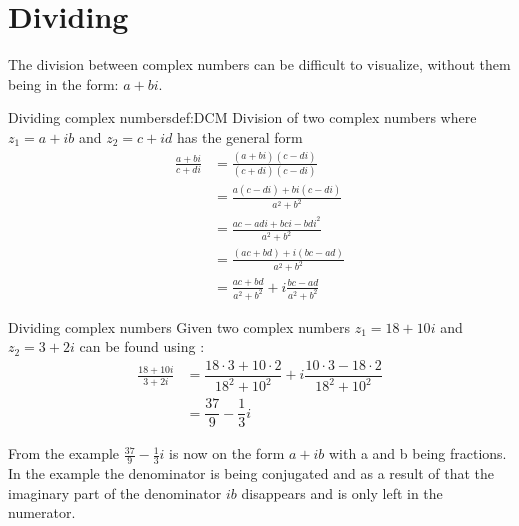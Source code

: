 \section{Dividing}
The division between complex numbers can be difficult to visualize, without them being in the form: $a + bi$. 
\begin{definition}{Dividing complex numbers}{def:DCM}
Division of two complex numbers where $z_1=a+ib$ and $z_2=c+id$ has the general form
\begin{align*}
\frac{a + bi}{c + di} 										
&= \frac{(a+bi)(c-di)}{(c+di)(c-di)} 						\\[1em]
&= \frac{a(c-di)+bi(c-di)}{a^2+b^2} 							\\[1em]
&= \frac{ac-adi+bci-bdi^2}{a^2+b^2}							\\[1em]
&= \frac{(ac+bd)+i(bc-ad)}{a^2+b^2}							\\[1em]
&= \frac{ac+bd}{a^2+b^2}+i \frac{bc-ad}{a^2+b^2}				
\end{align*}
\end{definition}
\begin{example}{Dividing complex numbers}{}
Given two complex numbers $z_1=18+10i$ and $z_2=3+2i$ can be found using :
\begin{align*}
\frac{18 + 10i}{3 + 2i} &= \dfrac{18\cdot3+10\cdot2}{18^2+10^2}+i\dfrac{10\cdot3-18\cdot2}{18^2+10^2}
\\
&=\dfrac{37}{9}-\dfrac{1}{3}i
\end{align*}
\end{example}


From the example $\frac{37}{9} - \frac{1}{3}i$ is now on the form $a+ib$ with a and b being fractions. In the example the denominator is being conjugated and as a result of that the imaginary part of the denominator $ib$ disappears and is only left in the numerator. 
